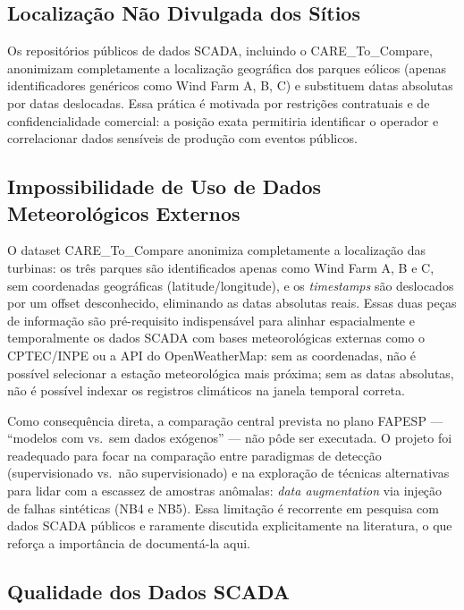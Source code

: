 \documentclass[12pt]{article}
\begin{document}
\subsection{Localização Não Divulgada dos Sítios}

Os repositórios públicos de dados SCADA, incluindo o CARE\_To\_Compare, anonimizam completamente a localização geográfica dos parques eólicos (apenas identificadores genéricos como Wind Farm A, B, C) e substituem datas absolutas por datas deslocadas. Essa prática é motivada por restrições contratuais e de confidencialidade comercial: a posição exata permitiria identificar o operador e correlacionar dados sensíveis de produção com eventos públicos.

\subsection{Impossibilidade de Uso de Dados Meteorológicos Externos}

O dataset CARE\_To\_Compare anonimiza completamente a localização das turbinas: os três parques são identificados apenas como Wind Farm A, B e C, sem coordenadas geográficas (latitude/longitude), e os \textit{timestamps} são deslocados por um offset desconhecido, eliminando as datas absolutas reais. Essas duas peças de informação são pré-requisito indispensável para alinhar espacialmente e temporalmente os dados SCADA com bases meteorológicas externas como o CPTEC/INPE ou a API do OpenWeatherMap: sem as coordenadas, não é possível selecionar a estação meteorológica mais próxima; sem as datas absolutas, não é possível indexar os registros climáticos na janela temporal correta.

Como consequência direta, a comparação central prevista no plano FAPESP --- ``modelos com vs.\ sem dados exógenos'' --- não pôde ser executada. O projeto foi readequado para focar na comparação entre paradigmas de detecção (supervisionado vs.\ não supervisionado) e na exploração de técnicas alternativas para lidar com a escassez de amostras anômalas: \textit{data augmentation} via injeção de falhas sintéticas (NB4 e NB5). Essa limitação é recorrente em pesquisa com dados SCADA públicos e raramente discutida explicitamente na literatura, o que reforça a importância de documentá-la aqui.

\subsection{Qualidade dos Dados SCADA}
\end{document}
